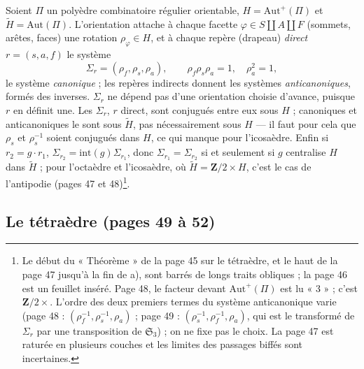 \documentclass[11pt,a4paper]{article}
\begin{document}
Soient $\Pi$ un polyèdre combinatoire régulier orientable, $H =
\mathrm{Aut}^+(\Pi)$ et $\widetilde H = \mathrm{Aut}(\Pi)$. L'orientation
attache à chaque facette $\varphi \in S \amalg A \amalg F$ (sommets, arêtes,
faces) une rotation $\rho_\varphi \in H$, et à chaque repère (drapeau)
\emph{direct} $r = (s, a, f)$ le système
\[
  \Sigma_r = (\rho_f, \rho_s, \rho_a), \qquad \rho_f\rho_s\rho_a = 1, \quad
  \rho_a^2 = 1 ,
\]
le système \emph{canonique} ; les repères indirects donnent les systèmes
\emph{anticanoniques}, formés des inverses. $\Sigma_r$ ne dépend pas d'une
orientation choisie d'avance, puisque $r$ en définit une. Les $\Sigma_r$, $r$
direct, sont conjugués entre eux sous $H$ ; canoniques et anticanoniques le
sont sous $\widetilde H$, pas nécessairement sous $H$ --- il faut pour cela que
$\rho_s$ et $\rho_s^{-1}$ soient conjugués dans $H$, ce qui manque pour
l'icosaèdre. Enfin si $r_2 = g \cdot r_1$, $\Sigma_{r_2} = \mathrm{int}(g)
\Sigma_{r_1}$, donc $\Sigma_{r_1} = \Sigma_{r_2}$ si et seulement si $g$
centralise $H$ dans $\widetilde H$ ; pour l'octaèdre et l'icosaèdre, où
$\widetilde H = \mathbf{Z}/2 \times H$, c'est le cas de l'antipodie (pages 47 et
48)\footnote{Le début du « Théorème » de la page 45 sur le tétraèdre, et le haut
de la page 47 jusqu'à la fin de a), sont barrés de longs traits obliques ; la
page 46 est un feuillet inséré. Page 48, le facteur devant
$\mathrm{Aut}^+(\Pi)$ est lu « 3 » ; c'est $\mathbf{Z}/2 \times$. L'ordre des
deux premiers termes du système anticanonique varie (page 48 :
$(\rho_f^{-1}, \rho_s^{-1}, \rho_a)$ ; page 49 : $(\rho_s^{-1}, \rho_f^{-1},
\rho_a)$, qui est le transformé de $\Sigma_r$ par une transposition de
$\mathfrak{S}_3$) ; on ne fixe pas le choix. La page 47 est raturée en
plusieurs couches et les limites des passages biffés sont incertaines.}.

\subsection*{Le tétraèdre (pages 49 à 52)}
\end{document}
